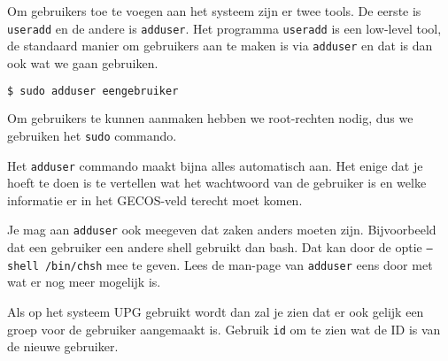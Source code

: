Om gebruikers toe te voegen aan het systeem zijn er twee tools. De eerste is \texttt{useradd} en de andere is \texttt{adduser}. Het programma \texttt{useradd} is een low-level tool, de standaard manier om gebruikers aan te maken is via \texttt{adduser} en dat is dan ook wat we gaan gebruiken.

\begin{lstlisting}[language=bash]
$ sudo adduser eengebruiker
\end{lstlisting}
Om gebruikers te kunnen aanmaken hebben we root-rechten nodig, dus we gebruiken het \texttt{sudo} commando.

Het \texttt{adduser} commando maakt bijna alles automatisch aan. Het enige dat je hoeft te doen is te vertellen wat het wachtwoord van de gebruiker is en welke informatie er in het GECOS-veld terecht moet komen.

Je mag aan \texttt{adduser} ook meegeven dat zaken anders moeten zijn. Bijvoorbeeld dat een gebruiker een andere shell gebruikt dan bash. Dat kan door de optie \texttt{--shell /bin/chsh} mee te geven. Lees de man-page van \texttt{adduser} eens door met wat er nog meer mogelijk is.

Als op het systeem UPG gebruikt wordt dan zal je zien dat er ook gelijk een groep voor de gebruiker aangemaakt is. Gebruik \texttt{id} om te zien wat de ID is van de nieuwe gebruiker.

